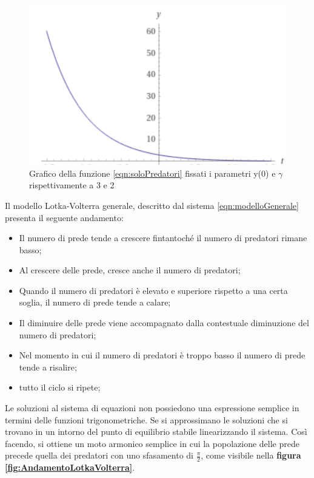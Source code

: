 \documentclass[11pt]{article}
\begin{document}
\begin{figure}[h]
    \centering
    \includegraphics[scale = 1]{plotSoloPredatori.PNG}
    \caption{Grafico della funzione \eqref{eqn:soloPredatori} fissati i parametri y(0) e $\gamma$ rispettivamente a 3 e 2}
    \label{figPlotLotkaVolterraSoloPredatori}
\end{figure}

Il modello Lotka-Volterra generale, descritto dal sistema \ref{eqn:modelloGenerale} presenta il seguente andamento: 
\begin{itemize}
    \item Il numero di prede tende a crescere fintantoché il numero di predatori rimane basso;
    \item Al crescere delle prede, cresce anche il numero di predatori;
    \item Quando il numero di predatori è elevato e superiore rispetto a una certa soglia, il numero di prede tende a calare;
    \item Il diminuire delle prede viene accompagnato dalla contestuale diminuzione del numero di predatori;
    \item Nel momento in cui il numero di predatori è troppo basso il numero di prede tende a risalire;
    \item tutto il ciclo si ripete;
\end{itemize}

Le soluzioni al sistema di equazioni non possiedono una espressione semplice in termini delle funzioni trigonometriche. Se si approssimano le soluzioni che si trovano in un intorno del punto di equilibrio stabile linearizzando il sistema. Così facendo, si ottiene un moto armonico semplice in cui la popolazione delle prede precede quella dei predatori con uno sfasamento di $\frac{\pi}{2}$, come visibile nella \textbf{figura \ref{fig:AndamentoLotkaVolterra}}\cite{WikiLotkaVolterra}.
\end{document}
